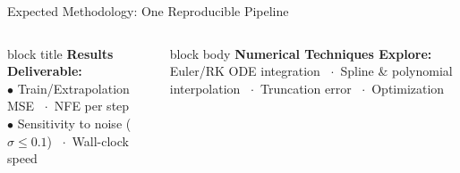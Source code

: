 \documentclass[aspectratio=169,10pt]{beamer}
\begin{document}
\begin{frame}{Expected Methodology: One Reproducible Pipeline}
\begin{center}
  \end{center}

  \vspace{0.55em}
  \begin{columns}[T,onlytextwidth]
      \begin{beamercolorbox}[rounded=true,sep=0.45em]{block title}
        \scriptsize\textbf{Results Deliverable:}\\[0.15em]
        $\bullet$ Train/Extrapolation MSE \ $\cdot$\ NFE per step\\
        $\bullet$ Sensitivity to noise ($\sigma \le 0.1$) \ $\cdot$\ Wall-clock speed
      \end{beamercolorbox}
      \begin{beamercolorbox}[rounded=true,sep=0.45em]{block body}
        \scriptsize\textbf{Numerical Techniques Explore:}\\[0.15em]
        Euler/RK ODE integration \ $\cdot$\ Spline \& polynomial interpolation \ $\cdot$\ Truncation error \ $\cdot$\ Optimization
      \end{beamercolorbox}
  \end{columns}
\end{frame}
\end{document}
